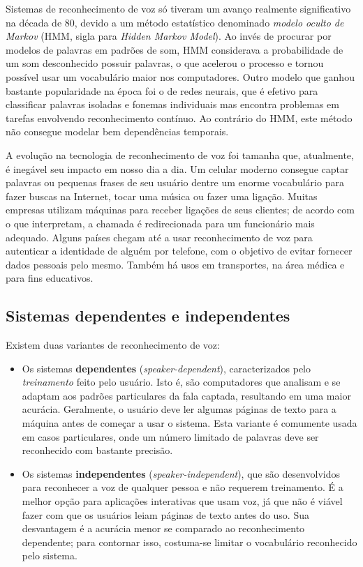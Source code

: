 Sistemas de reconhecimento de voz só tiveram um avanço realmente significativo na década de 80, devido a um método estatístico denominado \emph{modelo oculto de Markov} (HMM, sigla para \textit{Hidden Markov Model}). Ao invés de procurar por modelos de palavras em padrões de som, HMM considerava a probabilidade de um som desconhecido possuir palavras, o que acelerou o processo e tornou possível usar um vocabulário maior nos computadores. Outro modelo que ganhou bastante popularidade na época foi o de redes neurais, que é efetivo para classificar palavras isoladas e fonemas individuais mas encontra problemas em tarefas envolvendo reconhecimento contínuo. Ao contrário do HMM, este método não consegue modelar bem dependências temporais.

A evolução na tecnologia de reconhecimento de voz foi tamanha que, atualmente, é inegável seu impacto em nosso dia a dia. Um celular moderno consegue captar palavras ou pequenas frases de seu usuário dentre um enorme vocabulário para fazer buscas na Internet, tocar uma música ou fazer uma ligação. Muitas empresas utilizam máquinas para receber ligações de seus clientes; de acordo com o que interpretam, a chamada é redirecionada para um funcionário mais adequado. Alguns países chegam até a usar reconhecimento de voz para autenticar a identidade de alguém por telefone, com o objetivo de evitar fornecer dados pessoais pelo mesmo. Também há usos em transportes, na área médica e para fins educativos.


\subsection{Sistemas dependentes e independentes}

Existem duas variantes de reconhecimento de voz:

\begin{itemize}
\item Os sistemas \textbf{dependentes} (\textit{speaker-dependent}), caracterizados pelo \emph{treinamento} feito pelo usuário. Isto é, são computadores que analisam e se adaptam aos padrões particulares da fala captada, resultando em uma maior acurácia. Geralmente, o usuário deve ler algumas páginas de texto para a máquina antes de começar a usar o sistema. Esta variante é comumente usada em casos particulares, onde um número limitado de palavras deve ser reconhecido com bastante precisão.

\item Os sistemas \textbf{independentes} (\textit{speaker-independent}), que são desenvolvidos para reconhecer a voz de qualquer pessoa e não requerem treinamento. É a melhor opção para aplicações interativas que usam voz, já que não é viável fazer com que os usuários leiam páginas de texto antes do uso. Sua desvantagem é a acurácia menor se comparado ao reconhecimento dependente; para contornar isso, costuma-se limitar o vocabulário reconhecido pelo sistema.
\end{itemize}

